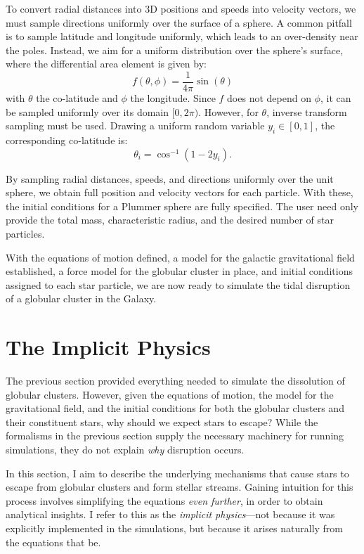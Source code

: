             To convert radial distances into 3D positions and speeds into velocity vectors, we must sample directions uniformly over the surface of a sphere. A common pitfall is to sample latitude and longitude uniformly, which leads to an over-density near the poles. Instead, we aim for a uniform distribution over the sphere's surface, where the differential area element is given by:
            \begin{equation}
                f(\theta,\phi)=\frac{1}{4\pi}\sin(\theta)
            \end{equation} 
            with $\theta$ the co-latitude and $\phi$ the longitude. Since $f$ does not depend on $\phi$, it can be sampled uniformly over its domain $[0, 2\pi)$. However, for $\theta$, inverse transform sampling must be used. Drawing a uniform random variable $y_i \in [0,1]$, the corresponding co-latitude is:
            \begin{equation}
                \theta_i = \cos^{-1}\left(1-2y_i\right).
            \end{equation}

            By sampling radial distances, speeds, and directions uniformly over the unit sphere, we obtain full position and velocity vectors for each particle. With these, the initial conditions for a Plummer sphere are fully specified. The user need only provide the total mass, characteristic radius, and the desired number of star particles.


            With the equations of motion defined, a model for the galactic gravitational field established, a force model for the globular cluster in place, and initial conditions assigned to each star particle, we are now ready to simulate the tidal disruption of a globular cluster in the Galaxy.



\section{The Implicit Physics}
    The previous section provided everything needed to simulate the dissolution of globular clusters. However, given the equations of motion, the model for the gravitational field, and the initial conditions for both the globular clusters and their constituent stars, why should we expect stars to escape? While the formalisms in the previous section supply the necessary machinery for running simulations, they do not explain \textit{why} disruption occurs.

    In this section, I aim to describe the underlying mechanisms that cause stars to escape from globular clusters and form stellar streams. Gaining intuition for this process involves simplifying the equations \textit{even further}, in order to obtain analytical insights. I refer to this as the \textit{implicit physics}—not because it was explicitly implemented in the simulations, but because it arises naturally from the equations that be.

